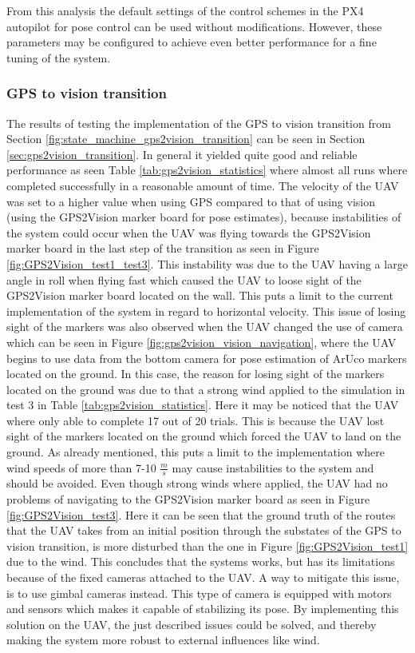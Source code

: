 \documentclass[../Head/report.tex]{subfiles}
\begin{document}
From this analysis the default settings of the control schemes in the PX4 autopilot for pose control can be used without modifications. However, these parameters may be configured to achieve even better performance for a fine tuning of the system.

\subsubsection*{GPS to vision transition}
The results of testing the implementation of the GPS to vision transition from Section \ref{fig:state_machine_gps2vision_transition} can be seen in Section \ref{sec:gps2vision_transition}. In general it yielded quite good and reliable performance as seen Table \ref{tab:gps2vision_statistics} where almost all runs where completed successfully in a reasonable amount of time. The velocity of the UAV was set to a higher value when using GPS compared to that of using vision (using the GPS2Vision marker board for pose estimates), because instabilities of the system could occur when the UAV was flying towards the GPS2Vision marker board in the last step of the transition as seen in Figure \ref{fig:GPS2Vision_test1_test3}. This instability was due to the UAV having a large angle in roll when flying fast which caused the UAV to loose sight of the GPS2Vision marker board located on the wall. This puts a limit to the current implementation of the system in regard to horizontal velocity. This issue of losing sight of the markers was also observed when the UAV changed the use of camera which can be seen in Figure \ref{fig:gps2vision_vision_navigation}, where the UAV begins to use data from the bottom camera for pose estimation of ArUco markers located on the ground. In this case, the reason for losing sight of the markers located on the ground was due to that a strong wind applied to the simulation in test 3 in Table \ref{tab:gps2vision_statistics}. Here it may be noticed that the UAV where only able to complete 17 out of 20 trials. This is because the UAV lost sight of the markers located on the ground which forced the UAV to land on the ground. As already mentioned, this puts a limit to the implementation where wind speeds of more than 7-10 $\frac{m}{s}$ may cause instabilities to the system and should be avoided. Even though strong winds where applied, the UAV had no problems of navigating to the GPS2Vision marker board as seen in Figure \ref{fig:GPS2Vision_test3}. Here it can be seen that the ground truth of the routes that the UAV takes from an initial position through the substates of the GPS to vision transition, is more disturbed than the one in Figure \ref{fig:GPS2Vision_test1} due to the wind. This concludes that the systems works, but has its limitations because of the fixed cameras attached to the UAV. A way to mitigate this issue, is to use gimbal cameras instead. This type of camera is equipped with motors and sensors which makes it capable of stabilizing its pose. By implementing this solution on the UAV, the just described issues could be solved, and thereby making the system more robust to external influences like wind.     
\end{document}

